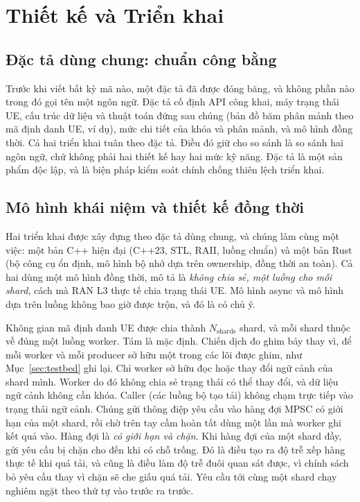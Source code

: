 \chapter{Thiết kế và Triển khai\label{chapter:design}}

\section{Đặc tả dùng chung: chuẩn công bằng}
\label{sec:fairness}
Trước khi viết bất kỳ mã nào, một đặc tả đã được đóng băng, và không phần nào trong đó gọi tên một ngôn ngữ.
Đặc tả cố định API công khai, máy trạng thái UE, cấu trúc dữ liệu và thuật toán đứng sau chúng
(bản đồ băm phân mảnh theo mã định danh UE, ví dụ), mức chi tiết của khóa và
phân mảnh, và mô hình đồng thời. Cả hai triển khai tuân theo đặc tả. Điều đó giữ cho
so sánh là so sánh hai ngôn ngữ, chứ không phải hai thiết kế hay hai mức kỹ năng. Đặc tả
là một sản phẩm độc lập, và là biện pháp kiểm soát chính chống
thiên lệch triển khai.

\section{Mô hình khái niệm và thiết kế đồng thời}\label{sec:concurrency}
Hai triển khai được xây dựng theo đặc tả dùng chung, và chúng làm cùng một việc: một
bản C++ hiện đại (C++23, STL, RAII, luồng chuẩn) và một bản Rust (bộ công cụ ổn định,
mô hình bộ nhớ dựa trên ownership, đồng thời an toàn). Cả hai dùng một mô hình đồng thời, mô tả là
\emph{không chia sẻ, một luồng cho mỗi shard}, cách mà RAN L3 thực tế chia trạng thái UE. Mô hình async và
mô hình dựa trên luồng không bao giờ được trộn, và đó là có chủ ý.

Không gian mã định danh UE được chia thành $N_{\text{shards}}$ shard, và mỗi shard thuộc về
đúng một luồng worker. Tám là mặc định. Chiến dịch đo ghim bảy thay vì, để
mỗi worker và mỗi producer sở hữu một trong các lõi được ghim, như
Mục~\ref{sec:testbed} ghi lại. Chỉ worker sở hữu đọc hoặc thay đổi ngữ cảnh của shard mình.
Worker do đó không chia sẻ trạng thái có thể thay đổi, và dữ liệu ngữ cảnh không cần khóa. Caller (các
luồng bộ tạo tải) không chạm trực tiếp vào trạng thái ngữ cảnh. Chúng gửi thông điệp yêu cầu vào
hàng đợi MPSC có giới hạn của một shard, rồi chờ trên tay cầm hoàn tất dùng một lần
mà worker ghi kết quả vào. Hàng đợi là \emph{có giới hạn và
chặn}. Khi hàng đợi của một shard đầy, gửi yêu cầu bị chặn cho đến khi có chỗ trống. Đó là điều
tạo ra độ trễ xếp hàng thực tế khi quá tải, và cũng là điều làm độ trễ đuôi
quan sát được, vì chính sách bỏ yêu cầu thay vì chặn sẽ che giấu
quá tải. Yêu cầu tới cùng một shard chạy nghiêm ngặt theo thứ tự vào trước ra trước.

